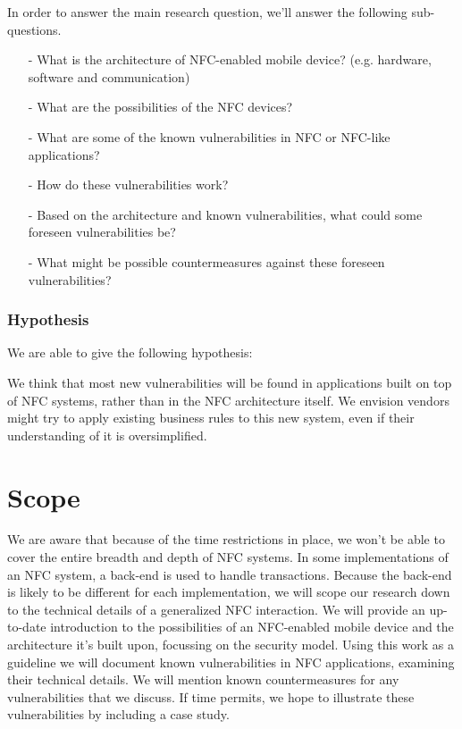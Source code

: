 \documentclass[11pt]{article} %
\begin{document}
In order to answer the main research question, we'll answer the following sub-questions.

\begin{itemize}
\item [-] What is the architecture of NFC-enabled mobile device? (e.g. hardware, software and communication)

\item [-] What are the possibilities of the NFC devices?

\item [-] What are some of the known vulnerabilities in NFC or NFC-like applications?

\item [-] How do these vulnerabilities work?

\item [-] Based on the architecture and known vulnerabilities, what could some foreseen vulnerabilities be?

\item [-] What might be possible countermeasures against these foreseen vulnerabilities?

\end{itemize}

\subsubsection{Hypothesis}
We are able to give the following hypothesis:

We think that most new vulnerabilities will be found in applications built on top of NFC systems, rather than in the NFC architecture itself.
We envision vendors might try to apply existing business rules to this new system, even if their understanding of it is oversimplified. %

\section{Scope}
We are aware that because of the time restrictions in place, we won't be able to cover the entire breadth and depth of NFC systems.
In some implementations of an NFC system, a back-end is used to handle transactions.
Because the back-end is likely to be different for each implementation, we will scope our research down to the technical details of a generalized NFC interaction.
We will provide an up-to-date introduction to the possibilities of an NFC-enabled mobile device and the architecture it's built upon, focussing on the security model.
Using this work as a guideline we will document known vulnerabilities in NFC applications, examining their technical details.
We will mention known countermeasures for any vulnerabilities that we discuss.
If time permits, we hope to illustrate these vulnerabilities by including a case study. %
\end{document}
